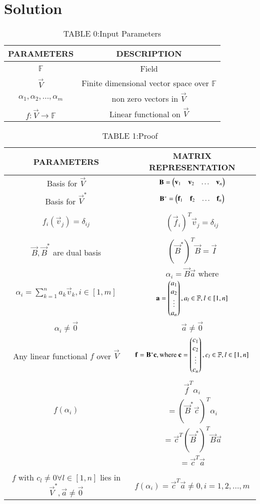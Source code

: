 \documentclass[journal,12pt,twocolumn]{IEEEtran}
\begin{document}
\section{Solution}
\begin{table*}[!ht]
\centering
\begin{tabular}{|c|c|}
\hline
\textbf{PARAMETERS}&\textbf{DESCRIPTION}\\
\hline
$\mathbb{F}$&Field\\
\hline
$\vec{V}$& Finite dimensional vector space over $\mathbb{F}$\\
\hline
$\alpha_1,\alpha_2,\hdots,\alpha_m$& non zero vectors in $\vec{V}$\\
\hline
$f:\vec{V}\rightarrow \mathbb{F}$&Linear functional on $\vec{V}$\\
\hline
\end{tabular}
\caption*{TABLE 0:Input Parameters}
\end{table*}

\begin{table*}[!hb]
\centering
\begin{tabular}{|c|c|}
\hline
\textbf{PARAMETERS}&\textbf{MATRIX REPRESENTATION}\\
\hline
 Basis for $\vec{V}$&$ \mathbf{B}=\begin{pmatrix}\mathbf{v}_1&\mathbf{v}_2&\hdots&\mathbf{v}_n\end{pmatrix}$\\
\hline
Basis for $\vec{V}^*$& $\mathbf{B}^*=\begin{pmatrix}\mathbf{f}_1&\mathbf{f}_2&\hdots&\mathbf{f}_n\end{pmatrix}$\\
\hline
 & \\
$f_i(\vec{v}_j)=\delta_{ij}$& $(\vec{f}_i)^T\vec{v}_j=\delta_{ij}$\\
\hline
 & \\
$\vec{B},\vec{B}^*$ are dual basis&$(\vec{B}^*)^T\vec{B}=\vec{I}$\\
\hline
$\alpha_i=\sum _{k=1}^n a_k\vec{v}_k,i\in [1,m]$&$ \alpha_i=\vec{B}\vec{a}$ where $ \mathbf{a}=\begin{pmatrix}a_1\\a_2\\\vdots\\a_n\end{pmatrix}, a_l \in \mathbb{F},l \in [1,n]$\\
\hline
$\alpha_i\neq \vec{0}$&$\vec{a}\neq\vec{0}$\\
\hline
Any linear functional $f$ over $\vec{V}$& $\mathbf{f}=\mathbf{B}^*\mathbf{c},\text{where }\mathbf{c}=\begin{pmatrix}c_1\\c_2\\\vdots\\c_n\end{pmatrix}, c_l \in \mathbb{F} ,l \in [1,n]$\\
\hline
 & \\
 & $ \vec{f}^T\alpha_i$\\
$ f(\alpha_i)$ &$
    =(\vec{B}^*\vec{c})^T\alpha_i$\\
     &$=\vec{c}^T(\vec{B}^*)^T\vec{B}\vec{a}$\\
     &$=\vec{c}^T\vec{a}$ \\
\hline
 & \\
$f$ with  $c_l \neq 0 \forall l \in [1,n]$ lies in $\vec{V}^*,\vec{a}\neq\vec{0}$ & $f(\alpha_i)=\vec{c}^T\vec{a}\neq 0, i=1,2,\hdots,m $\\
\hline
\end{tabular}
\caption*{TABLE 1:Proof}
\end{table*}
\end{document}
